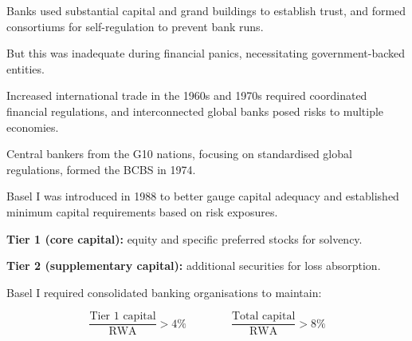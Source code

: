 


\begin{lettered}
\item Banks used substantial capital and grand buildings to establish trust, and
formed consortiums for self-regulation to prevent bank runs.
\item But this was inadequate during financial panics, necessitating
government-backed entities.
\item Increased international trade in the 1960s and 1970s required coordinated
financial regulations, and interconnected global banks posed risks to multiple
economies.
\end{lettered}


\begin{lettered}
\item Central bankers from the G10 nations, focusing on standardised global
regulations, formed the BCBS in 1974.
\item Basel I was introduced in 1988 to better gauge capital adequacy and
established minimum capital requirements based on risk exposures.
\end{lettered}


\begin{checks}
\item \textbf{Tier 1 (core capital):} equity and specific preferred stocks for
solvency.
\item \textbf{Tier 2 (supplementary capital):} additional securities for loss
absorption.
\end{checks}



Basel I required consolidated banking organisations to maintain:

\begin{orkeybox}
\[
\frac{\text{Tier 1 capital}}{\text{RWA}} > 4\%
\qquad\qquad
\frac{\text{Total capital}}{\text{RWA}} > 8\%
\]
\end{orkeybox}

